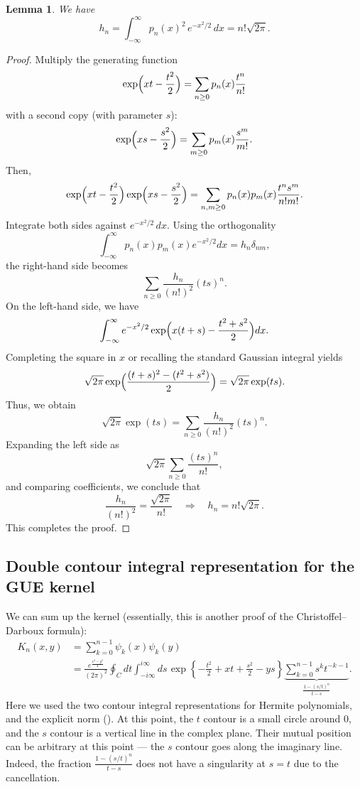 \documentclass[letterpaper,11pt,oneside,reqno]{book}
\numberwithin{equation}{chapter}  %
\newcommand{\ssp}{\hspace{1pt}}
\newtheorem{lemma}[proposition]{Lemma}
\theoremstyle{definition}
\begin{document}
\begin{lemma}
	\label{lecture6:lem:hermite_norm}
	We have
	\begin{equation*}
		h_n=\int_{-\infty}^{\infty} p_n(x)^2\,e^{-x^2/2}\,dx=n!\sqrt{2\pi}.
	\end{equation*}
\end{lemma}
\begin{proof}
Multiply the generating function
\[
	\exp\Bigl(xt-\frac{t^2}{2}\Bigr)=\sum_{n\ge0}p_n(x)\frac{t^n}{n!}
\]
with a second copy (with parameter \(s\)):
\[
	\exp\Bigl(xs-\frac{s^2}{2}\Bigr)=\sum_{m\ge0}p_m(x)\frac{s^m}{m!}.
\]
Then,
\[
	\exp\Bigl(xt-\frac{t^2}{2}\Bigr)\exp\Bigl(xs-\frac{s^2}{2}\Bigr)
	=\sum_{n,m\ge0}p_n(x)p_m(x)\frac{t^n s^m}{n!m!}.
\]
Integrate both sides against \(e^{-x^2/2}\,dx\). Using the orthogonality
\[
	\int_{-\infty}^{\infty}p_n(x)p_m(x)e^{-x^2/2}dx=h_n\delta_{nm},
\]
the right-hand side becomes
\[
	\sum_{n\ge0}\frac{h_n}{(n!)^2}(ts)^n.
\]
On the left-hand side, we have
\[
	\int_{-\infty}^{\infty}e^{-x^2/2}\exp\Bigl(x(t+s)-\frac{t^2+s^2}{2}\Bigr)dx.
\]
Completing the square in \(x\) or recalling the standard Gaussian integral yields
\[
	\sqrt{2\pi}\exp\Bigl(\frac{(t+s)^2-(t^2+s^2)}{2}\Bigr)
	=\sqrt{2\pi}\exp(ts).
\]
Thus, we obtain
\[
	\sqrt{2\pi}\exp(ts)=\sum_{n\ge0}\frac{h_n}{(n!)^2}(ts)^n.
\]
Expanding the left side as
\[
	\sqrt{2\pi}\sum_{n\ge0}\frac{(ts)^n}{n!},
\]
and comparing coefficients, we conclude that
\[
	\frac{h_n}{(n!)^2}=\frac{\sqrt{2\pi}}{n!}\quad\Longrightarrow\quad h_n=n!\sqrt{2\pi}.
\]
This completes the proof.
\end{proof}

\subsection{Double contour integral representation for the GUE kernel}

We can sum up the kernel (essentially, this is
another proof of the Christoffel--Darboux formula):
\begin{equation}\begin{split}
	K_n(x,y)&=
	\sum_{k=0}^{n-1}\psi_k(x)\psi_k(y)
	\\&=
	\frac{e^{\frac{x^2-y^2}{4}}}{(2\pi)^2}
	\oint_C dt\int_{-i\infty}^{i\infty}ds\ssp
	\exp\left\{ -\frac{t^2}{2}+xt+\frac{s^2}{2}-ys \right\}
	\underbrace{\sum_{k=0}^{n-1}
	s^k t^{-k-1}}_{\frac{1-(s/t)^n}{t-s}}.
\end{split}\label{lecture6:eq:K_n_sum}\end{equation}
Here we used the two contour integral representations for Hermite polynomials,
and the explicit norm ().
At this point, the $t$ contour is a small circle around $0$, and
the $s$ contour is a vertical line in the complex plane.
Their mutual position can be arbitrary at this point --- the $s$ contour
goes along the imaginary line.
Indeed, the fraction
$\frac{1-(s/t)^n}{t-s}$ does not have a singularity at $s=t$ due to the
cancellation.
\end{document}
